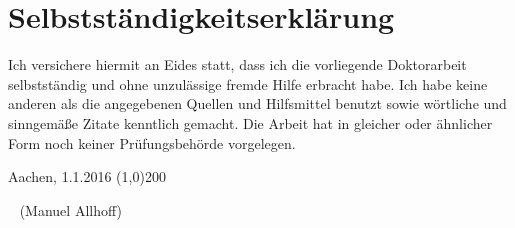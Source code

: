 \chapter*{Selbstständigkeitserklärung}

Ich versichere hiermit an Eides statt, dass ich die vorliegende Doktorarbeit selbstständig und
ohne unzulässige fremde Hilfe erbracht habe. Ich habe keine anderen als die angegebenen
Quellen und Hilfsmittel benutzt sowie wörtliche und sinngemäße Zitate kenntlich gemacht.
Die Arbeit hat in gleicher oder ähnlicher Form noch keiner Prüfungsbehörde vorgelegen.

\vspace{2cm}


\hfill Aachen, 1.1.2016 \hspace{0.1cm} \line(1,0){200}

\ \hspace{8cm} (Manuel Allhoff)
% 
% 



% 
% 
% 
